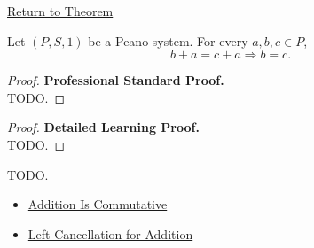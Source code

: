\newpage
{}
\label{prf:addition-right-cancellation}

\begin{remark*}[Return]
\hyperref[thm:addition-right-cancellation]{Return to Theorem}
\end{remark*}

\begin{theorem*}
Let $(P,S,1)$ be a Peano system. For every $a,b,c \in P$,
\[
b+a=c+a
\Longrightarrow
b=c.
\]
\end{theorem*}

\begin{proof}
\textbf{Professional Standard Proof.}~\\
TODO.
\end{proof}

\begin{proof}
\textbf{Detailed Learning Proof.}~\\
TODO.
\end{proof}

\begin{remark*}
TODO.
\end{remark*}

\begin{dependencies}
\begin{itemize}
  \item \hyperref[thm:addition-commutative]{Addition Is Commutative}
  \item \hyperref[thm:addition-left-cancellation]{Left Cancellation for Addition}
\end{itemize}
\end{dependencies}
